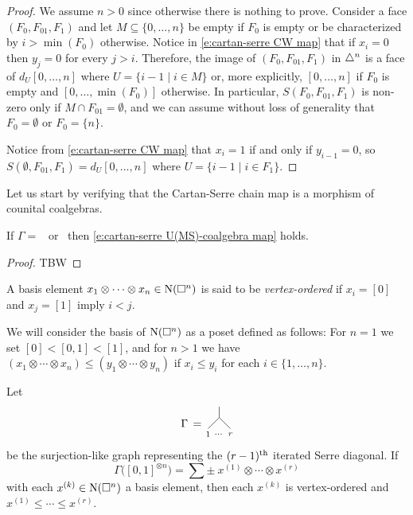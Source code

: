 \begin{proof}
	We assume $n > 0$ since otherwise there is nothing to prove.
	Consider a face $(F_0, F_{01}, F_1)$ and let $M \subseteq \{0, \dots, n\}$ be empty if $F_0$ is empty or be characterized by $i > \min (F_0)$ otherwise.
	Notice in \eqref{e:cartan-serre CW map} that if $x_i = 0$ then $y_j = 0$ for every $j > i$.
	Therefore, the image of $(F_0, F_{01}, F_1)$ in $\triangle^n$ is a face of $d_U[0, \dots, n]$ where $U = \{i-1 \mid i \in M\}$ or, more explicitly, $[0, \dots, n]$ if $F_0$ is empty and $[0, \dots, \min(F_0)]$ otherwise.
	In particular, $S(F_0, F_{01}, F_1)$ is non-zero only if $M \cap F_{01} = \emptyset$, and we can assume without loss of generality that $F_0 = \emptyset$ or $F_0 = \{n\}$.
	
	Notice from \eqref{e:cartan-serre CW map} that $x_i = 1$ if and only if $y_{i-1} = 0$, so $S(\emptyset, F_{01}, F_1) = d_{U} [0, \dots, n]$ where $U = \{i-1 \mid i \in F_1\}$.
\end{proof}

Let us start by verifying that the Cartan-Serre chain map is a morphism of counital coalgebras.
\begin{lemma}
	If $\Gamma =$ \counit \ or \coproduct \ then \eqref{e:cartan-serre U(MS)-coalgebra map} holds.
\end{lemma}

\begin{proof}
	TBW
\end{proof}

\begin{definition}
	A basis element $x_1 \otimes \cdots \otimes x_n \in \operatorname{N}(\square^n)$ is said to be  \textit{vertex-ordered} if $x_i = [0]$ and $x_j = [1]$ imply $i < j$.
\end{definition}

We will consider the basis of $\operatorname{N}(\square^n)$ as a poset defined as follows:
For $n = 1$ we set $[0] < [0,1] < [1]$, and for $n > 1$ we have $(x_1 \otimes \cdots \otimes x_n) \leq (y_1 \otimes \cdots \otimes y_n)$ if $x_i \leq y_i$ for each $i \in \{1, \dots, n\}$. 

\begin{lemma}
	Let
	\begin{equation*}
	\begin{tikzpicture}[scale=.35]
	\node at (9.5, 1){$\Gamma \, = $};
	\draw (11,.5)--(12,1.5)--(12,2.5);
	\draw (13,.5)--(12,1.5);
	\node at (11,0){$\scriptstyle 1$};
	\node at (12,0){$\scriptstyle \dots$};
	\node at (13,0){$\scriptstyle r$};
	\end{tikzpicture}
	\end{equation*}
	be the surjection-like graph representing the $(r-1)^\mathrm{th}$ iterated Serre diagonal.
	If
	\begin{equation*}	
	\Gamma\big([0,1]^{\otimes n}\big) =
	\sum \pm \ x^{(1)} \otimes \cdots \otimes x^{(r)}
	\end{equation*}
	with each $x^{(k)} \in \operatorname{N}(\square^n)$ a basis element, then each $x^{(k)}$ is vertex-ordered and $x^{(1)} \leq \cdots \leq x^{(r)}$.
\end{lemma}

